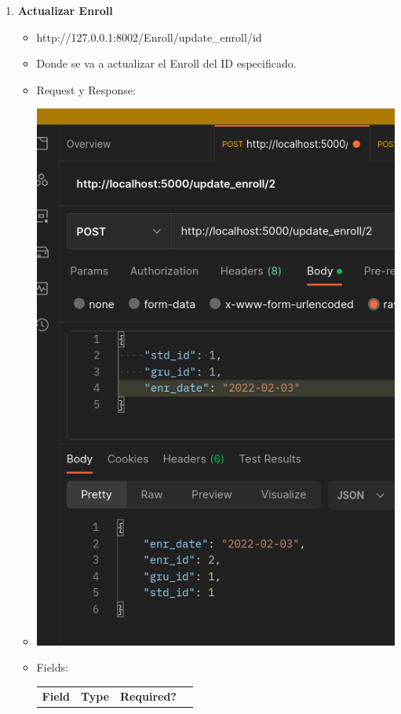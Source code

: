 \documentclass{article}
\begin{document}
\begin{enumerate}
    \item \textbf{Actualizar Enroll}
    \begin{itemize}
        \item http://127.0.0.1:8002/Enroll/update\_enroll/id
        \item Donde se va a actualizar el Enroll del ID especificado.
        \item Request y Response:
        \item \includegraphics[scale=.5]{assets/enroll/update.png}
        \item Fields:
        \begin{table}[H] \centering \begin{tabular}{|l|l|l|l|} \hline
        \multicolumn{1}{|c|}{\textbf{Field}} &
        \multicolumn{1}{c|}{\textbf{Type}} &
        \multicolumn{1}{c|}{\textbf{Required?}} &

\end{tabular}
\end{table}
\end{itemize}
\end{enumerate}
\end{document}
